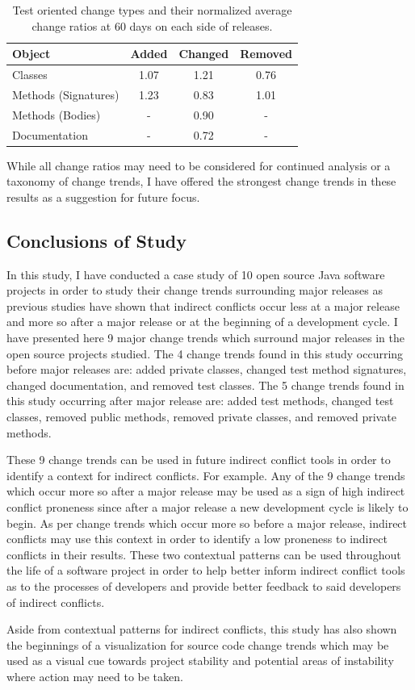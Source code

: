 \begin{table}[ht]
\begin{center}
\begin{tabular}{| l | c | c | c |}
\hline
Object & Added & Changed & Removed\\
\hline
Classes & 1.07 & 1.21 & 0.76 \\
Methods (Signatures) & 1.23 & 0.83 & 1.01 \\
Methods (Bodies) & - & 0.90 & - \\
Documentation & - & 0.72 & - \\
\hline
\end{tabular}
\end{center}
\caption{Test oriented change types and their normalized average change ratios at 60 days on each side of releases. \label{tab:test}}
\end{table}

While all change ratios may need to be considered for continued analysis or a taxonomy of change trends, I have offered the strongest
change trends in these results as a suggestion for future focus.

\subsection{Conclusions of Study}

In this study, I have conducted a case study of 10 open source Java software projects in order to study their change trends surrounding
major releases as previous studies have shown that indirect conflicts occur less at a major release and more so after a major release
or at the beginning of a development cycle. I have presented here 9 major change trends which surround major releases in the open source
projects studied. The 4 change trends found in this study occurring before major releases are: added private classes, 
changed test method signatures, changed documentation, and removed test classes.
The 5 change trends found in this study occurring after major release are: added test methods, changed test classes, removed public methods, removed
private classes, and removed private methods.

These 9 change trends can be used in future indirect conflict tools in order to identify a context for indirect conflicts.
For example. Any of the 9 change trends which occur more so after a major release may be used as a sign of high indirect conflict proneness
since after a major release a new development cycle is likely to begin. As per change trends which occur more so before a major release, indirect
conflicts may use this context in order to identify a low proneness to indirect conflicts in their results. These two contextual patterns
can be used throughout the life of a software project in order to help better inform indirect conflict tools as to the processes of developers
and provide better feedback to said developers of indirect conflicts.

Aside from contextual patterns for indirect conflicts, this study has also shown the beginnings of a visualization for source code change trends which may
be used as a visual cue towards project stability and potential areas of instability where action may need to be taken.
